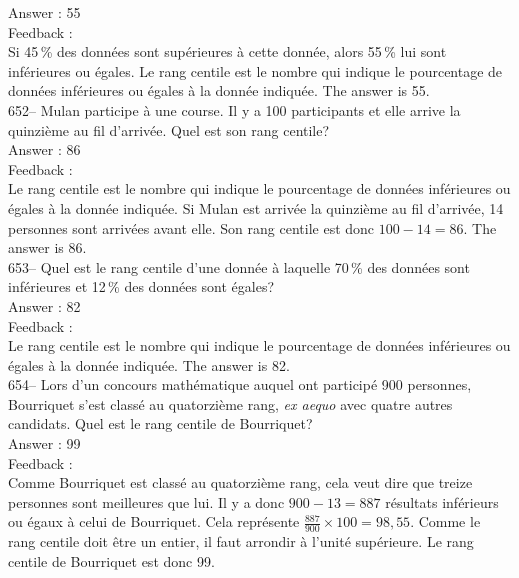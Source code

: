 ﻿\documentclass[letterpaper, 12pt]{article}
\begin{document}
Answer : 55\\

Feedback : \\
Si 45\,\% des donn\'ees sont sup\'erieures \`a cette donn\'ee, alors 55\,\%
lui sont inf\'erieures ou \'egales.  Le rang centile est le nombre qui
indique le pourcentage de donn\'ees inf\'erieures ou \'egales \`a la
donn\'ee indiqu\'ee.  The answer is 55.\\

652-- Mulan participe \`a une course.  Il y a 100 participants et elle
arrive la quinzi\`eme au fil d'arriv\'ee.  Quel est son rang centile?\\

Answer : 86\\

Feedback : \\
Le rang centile est le nombre qui indique le pourcentage de donn\'ees
inf\'erieures ou \'egales \`a la donn\'ee indiqu\'ee.  Si Mulan est
arriv\'ee la quinzi\`eme au fil d'arriv\'ee, 14 personnes sont arriv\'ees
avant elle.  Son rang centile est donc $100-14=86$.  The answer is 86.\\

653-- Quel est le rang centile d'une donn\'ee \`a laquelle 70\,\% des
donn\'ees sont inf\'erieures et 12\,\% des donn\'ees sont \'egales?\\

Answer : 82\\

Feedback : \\
Le rang centile est le nombre qui indique le pourcentage de donn\'ees
inf\'erieures ou \'egales \`a la donn\'ee indiqu\'ee.  The answer is
82.\\

654--  Lors d'un concours math\'ematique auquel ont particip\'e 900
personnes, Bourriquet s'est class\'e au quatorzi\`eme rang, \emph{ex aequo}
avec quatre autres candidats.  Quel est le rang centile de Bourriquet?\\

Answer : 99\\

Feedback : \\
Comme Bourriquet est class\'e au quatorzi\`eme rang, cela veut dire que
treize personnes sont meilleures que lui.  Il y a donc $900-13=887$
r\'esultats inf\'erieurs ou \'egaux \`a celui de Bourriquet.  Cela
repr\'esente $\frac{887}{900}\times100=98,55$.  Comme le rang centile doit
\^etre un entier, il faut arrondir \`a l'unit\'e sup\'erieure.  Le rang
centile de Bourriquet est donc 99.\\
\end{document}
